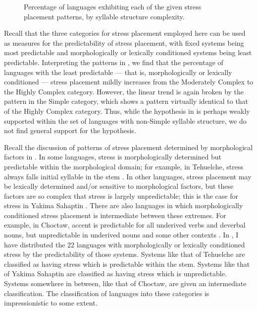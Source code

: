 \begin{figure}
\caption{\label{fig:5.1} Percentage of languages exhibiting each of the given stress placement patterns, by syllable structure complexity.}
\end{figure}

  Recall that the three categories for stress placement employed here can be used as measures for the predictability of stress placement, with fixed systems being most predictable and morphologically or lexically conditioned systems being least predictable. Interpreting the patterns in , we find that the percentage of languages with the least predictable — that is, morphologically or lexically conditioned — stress placement mildly increases from the Moderately Complex to the Highly Complex category. However, the linear trend is again broken by the pattern in the Simple category, which shows a pattern virtually identical to that of the Highly Complex category. Thus, while the hypothesis in  is perhaps weakly supported within the set of languages with non-Simple syllable structure, we do not find general support for the hypothesis.

  Recall the discussion of patterns of stress placement determined by morphological factors in . In some languages, stress is morphologically determined but predictable within the morphological domain; for example, in Tehuelche, stress always falls initial syllable in the stem . In other languages, stress placement may be lexically determined and/or sensitive to morphological factors, but these factors are so complex that stress is largely unpredictable; this is the case for stress in Yakima Sahaptin . There are also languages in which morphologically conditioned stress placement is intermediate between these extremes. For example, in Choctaw, accent is predictable for all underived verbs and deverbal nouns, but unpredictable in underived nouns and some other contexts \citep{Broadwell2006}. In , I have distributed the 22 languages with morphologically or lexically conditioned stress by the predictability of those systems. Systems like that of Tehuelche are classified as having stress which is predictable within the stem. Systems like that of Yakima Sahaptin are classified as having stress which is unpredictable. Systems somewhere in between, like that of Choctaw, are given an intermediate classification. The classification of languages into these categories is impressionistic to some extent.

